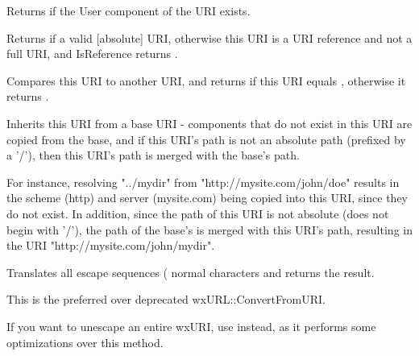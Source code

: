 \label{wxurihasuserinfo}


Returns \true if the User component of the URI exists.


\label{wxuriisreference}


Returns \true if a valid [absolute] URI, otherwise this URI
is a URI reference and not a full URI, and IsReference
returns \false.


\label{wxurioperatorcompare}


Compares this URI to another URI, and returns \true if 
this URI equals , otherwise it returns \false.



\label{wxuriresolve}


Inherits this URI from a base URI - components that do not
exist in this URI are copied from the base, and if this URI's
path is not an absolute path (prefixed by a '/'), then this URI's
path is merged with the base's path.

For instance, resolving "../mydir" from "http://mysite.com/john/doe" 
results in the scheme (http) and server (mysite.com) being copied into 
this URI, since they do not exist.  In addition, since the path
of this URI is not absolute (does not begin with '/'), the path
of the base's is merged with this URI's path, resulting in the URI
"http://mysite.com/john/mydir".


\label{wxuriunescape}


Translates all escape sequences (%
normal characters and returns the result.

This is the preferred over deprecated wxURL::ConvertFromURI.

If you want to unescape an entire wxURI, use  instead,
as it performs some optimizations over this method.



